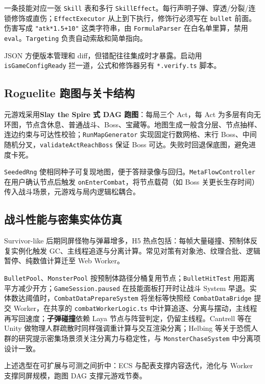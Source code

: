\documentclass[UTF8,a4paper]{ctexart}
\begin{document}
一条技能对应一张 \texttt{Skill} 表和多行 \texttt{SkillEffect}。每行声明子弹、穿透/分裂/连锁修饰或直伤；\texttt{EffectExecutor} 从上到下执行，修饰行必须写在 \texttt{bullet} 前面。伤害写成 \texttt{"atk*1.5+10"} 这类字符串，由 \texttt{FormulaParser} 在白名单里算，禁用 \texttt{eval}。\texttt{Targeting} 负责自动索敌和简单指向。

JSON 方便版本管理和 diff，但错配往往集成时才暴露。启动用 \texttt{isGameConfigReady} 拦一道，公式和修饰器另有 \texttt{*.verify.ts} 脚本。

\subsection{Roguelite 跑图与关卡结构}

元游戏采用\textbf{Slay the Spire 式 DAG 跑图}：每局三个 Act，每 Act 为多层有向无环图，节点含休息、普通战斗、Boss、宝藏等\cite{gregory2018game}。地图生成一般含分层、节点抽样、连边约束与可达性校验；\texttt{RunMapGenerator} 实现固定行数网格、末行 Boss、中间随机分叉，\texttt{validateActReachBoss} 保证 Boss 可达。失败时回退保底图，避免进度卡死。

\texttt{SeededRng} 使相同种子可复现地图，便于答辩录像与回归。\texttt{MetaFlowController} 在用户确认节点后触发 \texttt{onEnterCombat}，将节点载荷（如 Boss 关更长生存时间）传入战斗场景，元游戏与局内逻辑松耦合。

\subsection{战斗性能与密集实体仿真}

Survivor-like 后期同屏怪物与弹幕增多，H5 热点包括：每帧大量碰撞、预制体反复实例化触发 GC、主线程追逐与分离计算。常见对策有对象池、纹理合批、逻辑暂停、纯数值计算迁至 Web Worker\cite{gregory2018game,mckenzie2008crowd}。

\texttt{BulletPool}、\texttt{MonsterPool} 按预制体路径分桶复用节点；\texttt{BulletHitTest} 用距离平方减少开方；\texttt{GameSession.paused} 在技能面板打开时让战斗 System 早退。实体数达阈值时，\texttt{CombatDataPrepareSystem} 将坐标等快照经 \texttt{CombatDataBridge} 提交 Worker，在共享的 \texttt{combatWorkerLogic.ts} 中计算追逐、分离与摆动，主线程再写回速度；\textbf{子弹碰撞}依赖 Laya 节点与阵营判定，仍留主线程。Cantrell 等在 Unity 做物理人群疏散时同样强调重计算与交互渲染分离\cite{cantrell2018unity}；Helbing 等关于恐慌人群的研究提示密集场景须关注分离力与稳定性\cite{helbing2000panic}，与 \texttt{MonsterChaseSystem} 中分离项设计一致。

上述选型在可扩展与可测之间折中：ECS 与配表支撑内容迭代，池化与 Worker 支撑同屏规模，跑图 DAG 支撑元游戏节奏。
\end{document}
